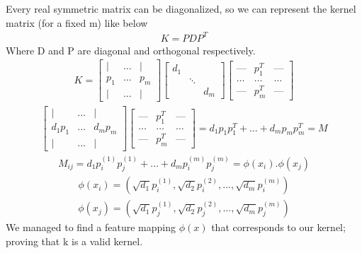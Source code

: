 \documentclass[12pt,onecolumn,a4paper]{article}
\begin{document}
\subsubsection{}
Every real symmetric matrix can be diagonalized, so we can represent the kernel matrix (for a fixed m) like below
\begin{align*}
	K = P D P^T
\end{align*}
Where D and P are diagonal and orthogonal respectively.
\begin{align*}
	K = \begin{bmatrix}
		\vert & \dots  &\vert \\
		p_1   & \dots & p_m   \\
		\vert & \dots &\vert
	\end{bmatrix}
		\begin{bmatrix}
			d_{1} & & \\
			& \ddots & \\
			& & d_{m}
		\end{bmatrix}	
	\begin{bmatrix}
	\text{---} & p_1^T & \text{---} \\
	\dots & \dots & \dots \\
	\text{---} & p_m^T & \text{---}
	\end{bmatrix}
\end{align*}
\begin{align*}
	\begin{bmatrix}
		\vert & \dots  &\vert \\
		d_1p_1   & \dots & d_mp_m   \\
		\vert & \dots &\vert
	\end{bmatrix}
\begin{bmatrix}
	\text{---} & p_1^T & \text{---} \\
	\dots & \dots & \dots \\
	\text{---} & p_m^T & \text{---}
\end{bmatrix} = d_1 p_1p_1^T + \dots + d_m p_m p_m^T = M
\end{align*}
\begin{align*}
	M_{ij} = d_1 p_i^{(1)}p_j^{(1)} + \dots + d_m p_i^{(m)} p_j^{(m)} = \phi(x_i).\phi(x_j)
\end{align*}
\begin{align*}
	 \phi(x_i) = (\sqrt{d_1}p^{(1)}_i, \sqrt{d_2}p_i^{(2)}, \dots, \sqrt{d_m}p_i^{(m)}) 
\end{align*}
\begin{align*}
	\phi(x_j) = (\sqrt{d_1}p^{(1)}_j, \sqrt{d_2}p_j^{(2)}, \dots, \sqrt{d_m}p_j^{(m)}) 
\end{align*}
We managed to find a feature mapping $\phi(x)$ that corresponds to our kernel; proving that k is a valid kernel.
\end{document}

